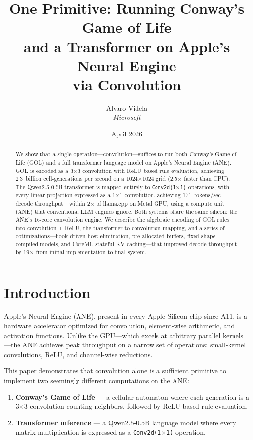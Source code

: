 \documentclass[11pt,twocolumn]{article}
\title{One Primitive: Running Conway's Game of Life\\and a Transformer on Apple's Neural Engine\\via Convolution}
\author{Alvaro Videla\\
\textit{Microsoft}}
\date{April 2026}
\begin{document}
\maketitle

\begin{abstract}
We show that a single operation---convolution---suffices to run both
Conway's Game of Life (GOL) and a full transformer language model on
Apple's Neural Engine (ANE).
%
GOL is encoded as a 3$\times$3 convolution with ReLU-based rule
evaluation, achieving 2.3~billion cell-generations per second on a
1024$\times$1024 grid (2.5$\times$ faster than CPU).
%
The Qwen2.5-0.5B transformer is mapped entirely to
\texttt{Conv2d(1$\times$1)} operations, with every linear projection
expressed as a 1$\times$1 convolution, achieving 171~tokens/sec decode
throughput---within 2$\times$ of llama.cpp on Metal GPU, using a
compute unit (ANE) that conventional LLM engines ignore.
%
Both systems share the same silicon: the ANE's 16-core convolution
engine. We describe the algebraic encoding of GOL rules into
convolution + ReLU, the transformer-to-convolution mapping, and a
series of optimizations---book-driven host elimination, pre-allocated
buffers, fixed-shape compiled models, and CoreML stateful KV
caching---that improved decode throughput by 19$\times$ from initial
implementation to final system.
\end{abstract}

\section{Introduction}
\label{sec:intro}

Apple's Neural Engine (ANE), present in every Apple Silicon chip since
A11, is a hardware accelerator optimized for convolution, element-wise
arithmetic, and activation functions. Unlike the GPU---which excels at
arbitrary parallel kernels---the ANE achieves peak throughput on a
narrow set of operations: small-kernel convolutions, ReLU, and
channel-wise reductions.

This paper demonstrates that convolution alone is a sufficient
primitive to implement two seemingly different computations on the ANE:

\begin{enumerate}
\item \textbf{Conway's Game of Life} --- a cellular automaton where
each generation is a 3$\times$3 convolution counting neighbors,
followed by ReLU-based rule evaluation.

\item \textbf{Transformer inference} --- a Qwen2.5-0.5B language model
where every matrix multiplication is expressed as a
\texttt{Conv2d(1$\times$1)} operation.
\end{enumerate}
\end{document}
